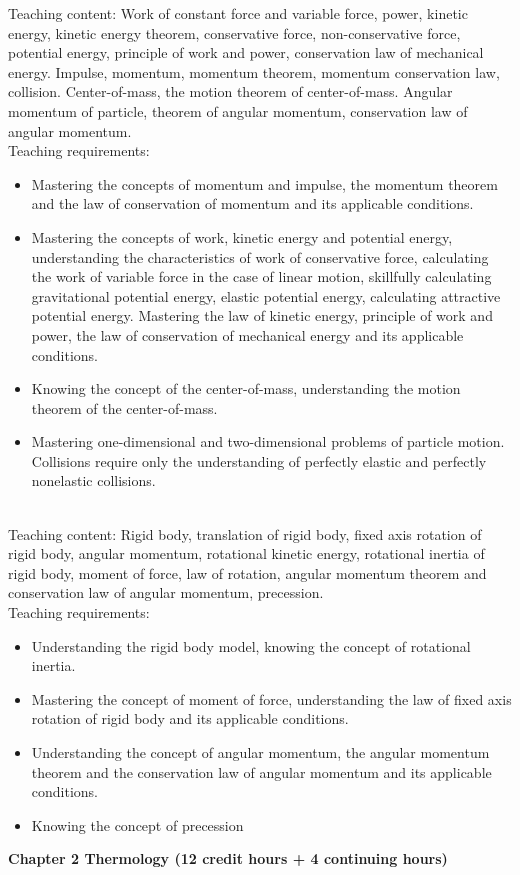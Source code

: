 \documentclass[10pt,a4paper,oneside]{article}
\begin{document}
Teaching content: Work of constant force and variable force, power, kinetic energy, kinetic energy theorem, conservative force, non-conservative force, potential energy, principle of work and power, conservation law of mechanical energy. Impulse, momentum, momentum theorem, momentum conservation law, collision. Center-of-mass, the motion theorem of center-of-mass. Angular momentum of particle, theorem of angular momentum, conservation law of angular momentum.\\

Teaching requirements:
\begin{itemize}
	\item Mastering the concepts of momentum and impulse, the momentum theorem and the law of conservation of momentum and its applicable conditions.
	\item Mastering the concepts of work, kinetic energy and potential energy, understanding the characteristics of work of conservative force, calculating the work of variable force in the case of linear motion, skillfully calculating gravitational potential energy, elastic potential energy, calculating attractive potential energy. Mastering the law of kinetic energy, principle of work and power, the law of conservation of mechanical energy and its applicable conditions.
	\item Knowing the concept of the center-of-mass, understanding the motion theorem of the center-of-mass.
	\item Mastering one-dimensional and two-dimensional problems of particle motion. Collisions require only the understanding of perfectly elastic and perfectly nonelastic collisions.
\end{itemize}
\\

Teaching content: Rigid body, translation of rigid body, fixed axis rotation of rigid body, angular momentum, rotational kinetic energy, rotational inertia of rigid body, moment of force, law of rotation, angular momentum theorem and conservation law of angular momentum, precession.\\

Teaching requirements:
\begin{itemize}
	\item Understanding the rigid body model, knowing the concept of rotational inertia.
	\item Mastering the concept of moment of force, understanding the law of fixed axis rotation of rigid body and its applicable conditions.
	\item Understanding the concept of angular momentum, the angular momentum theorem and the conservation law of angular momentum and its applicable conditions.
	\item Knowing the concept of precession
\end{itemize}
{\bfseries Chapter 2 Thermology (12 credit hours + 4 continuing hours)}\\
\end{document}
